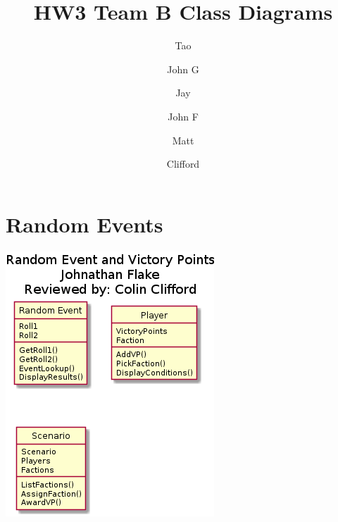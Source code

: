 \documentclass{article}
\author{
  Tao \\ \and John G \\ \and Jay \\ \and John F \\ \and Matt \\ \and Clifford 
}
\title{HW3 Team B Class Diagrams}
\begin{document}
  \maketitle

\section{Random Events}
\includegraphics[width=\textwidth]{pngs/randomevents.png}
\end{document}
